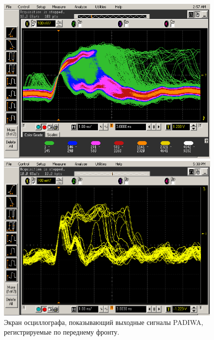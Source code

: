 \begin{figure}
\begin{minipage}[b]{0.495\textwidth}
\includegraphics[width=1.0\textwidth]{pictures/28_Scope_additional.png}
\end{minipage}
\hspace{0.01\textwidth}
\begin{minipage}[b]{0.495\textwidth}
\includegraphics[width=1.0\textwidth]{pictures/28_Scope2.png}
\end{minipage}
\caption{Экран осциллографа, показывающий выходные сигналы PADIWA, регистрируемые по переднему фронту.}
\label{fig:ToTscope}
\end{figure}

